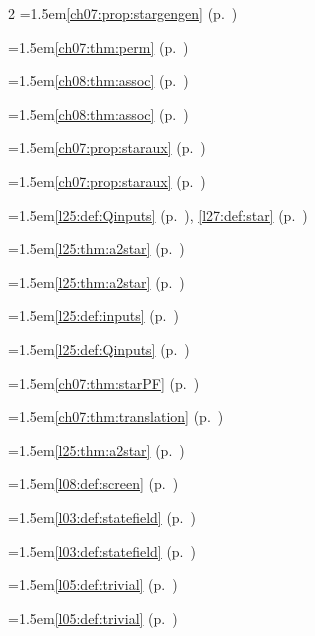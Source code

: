 \begin{multicols}{2}
\hangindent=1.5em\quad \ref{ch07:prop:stargengen} (p.~\pageref{ch07:prop:stargengen})\par
\hangindent=1.5em\quad \ref{ch07:thm:perm} (p.~\pageref{ch07:thm:perm})\par
\hangindent=1.5em\quad \ref{ch08:thm:assoc} (p.~\pageref{ch08:thm:assoc})\par
\hangindent=1.5em\quad \ref{ch08:thm:assoc} (p.~\pageref{ch08:thm:assoc})\par
\hangindent=1.5em\quad \ref{ch07:prop:staraux} (p.~\pageref{ch07:prop:staraux})\par
\hangindent=1.5em\quad \ref{ch07:prop:staraux} (p.~\pageref{ch07:prop:staraux})\par
\hangindent=1.5em\quad \ref{l25:def:Qinputs} (p.~\pageref{l25:def:Qinputs}), \ref{l27:def:star} (p.~\pageref{l27:def:star})\par
\hangindent=1.5em\quad \ref{l25:thm:a2star} (p.~\pageref{l25:thm:a2star})\par
\hangindent=1.5em\quad \ref{l25:thm:a2star} (p.~\pageref{l25:thm:a2star})\par
\hangindent=1.5em\quad \ref{l25:def:inputs} (p.~\pageref{l25:def:inputs})\par
\hangindent=1.5em\quad \ref{l25:def:Qinputs} (p.~\pageref{l25:def:Qinputs})\par
\hangindent=1.5em\quad \ref{ch07:thm:starPF} (p.~\pageref{ch07:thm:starPF})\par
\hangindent=1.5em\quad \ref{ch07:thm:translation} (p.~\pageref{ch07:thm:translation})\par
\hangindent=1.5em\quad \ref{l25:thm:a2star} (p.~\pageref{l25:thm:a2star})\par
\hangindent=1.5em\quad \ref{l08:def:screen} (p.~\pageref{l08:def:screen})\par
\hangindent=1.5em\quad \ref{l03:def:statefield} (p.~\pageref{l03:def:statefield})\par
\hangindent=1.5em\quad \ref{l03:def:statefield} (p.~\pageref{l03:def:statefield})\par
\hangindent=1.5em\quad \ref{l05:def:trivial} (p.~\pageref{l05:def:trivial})\par
\hangindent=1.5em\quad \ref{l05:def:trivial} (p.~\pageref{l05:def:trivial})\par

\end{multicols}
